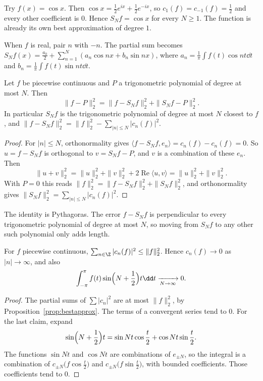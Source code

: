 Try $f(x)=\cos x$. Then $\cos x=\frac12 e^{ix}+\frac12 e^{-ix}$, so $c_1(f)=c_{-1}(f)=\frac12$ and every other coefficient is $0$. Hence $S_Nf=\cos x$ for every $N\ge1$. The function is already its own best approximation of degree $1$.

When $f$ is real, pair $n$ with $-n$. The partial sum becomes $S_Nf(x)=\frac{a_0}2+\sum_{n=1}^N(a_n\cos nx+b_n\sin nx)$, where
$a_n=\frac1\pi\int f(t)\cos nt\dd t$ and $b_n=\frac1\pi\int f(t)\sin nt\dd t$.

\begin{proposition}\label{prop:bestapprox}
Let $f$ be piecewise continuous and $P$ a trigonometric polynomial of degree at most $N$. Then
\[
\|f-P\|_2^2=\|f-S_Nf\|_2^2+\|S_Nf-P\|_2^2.
\]
In particular $S_Nf$ is the trigonometric polynomial of degree at most $N$ closest to $f$, and
$\|f-S_Nf\|_2^2=\|f\|_2^2-\sum_{|n|\le N}|c_n(f)|^2$.
\end{proposition}
\begin{proof}
For $|n|\le N$, orthonormality gives $\langle f-S_Nf,e_n\rangle=c_n(f)-c_n(f)=0$. So $u=f-S_Nf$ is orthogonal to $v=S_Nf-P$, and $v$ is a combination of these $e_n$. Then
\[
\|u+v\|_2^2=\|u\|_2^2+\|v\|_2^2+2\operatorname{Re}\langle u,v\rangle=\|u\|_2^2+\|v\|_2^2.
\]
With $P=0$ this reads $\|f\|_2^2=\|f-S_Nf\|_2^2+\|S_Nf\|_2^2$, and orthonormality gives $\|S_Nf\|_2^2=\sum_{|n|\le N}|c_n(f)|^2$.
\end{proof}

The identity is Pythagoras. The error $f-S_Nf$ is perpendicular to every trigonometric polynomial of degree at most $N$, so moving from $S_Nf$ to any other such polynomial only adds length.

\begin{corollary}\label{cor:bessel}
For $f$ piecewise continuous, $\sum_{n\in\Z}|c_n(f)|^2\le\|f\|_2^2$. Hence $c_n(f)\to0$ as $|n|\to\infty$, and also
\[
\int_{-\pi}^\pi f(t)\sin\Bigl(N+\frac12\Bigr)t\dd t\xrightarrow[N\to\infty]{}0.
\]
\end{corollary}
\begin{proof}
The partial sums of $\sum|c_n|^2$ are at most $\|f\|_2^2$, by Proposition~\ref{prop:bestapprox}. The terms of a convergent series tend to $0$. For the last claim, expand
\[
\sin\Bigl(N+\frac12\Bigr)t=\sin Nt\cos\frac t2+\cos Nt\sin\frac t2.
\]
The functions $\sin Nt$ and $\cos Nt$ are combinations of $e_{\pm N}$, so the integral is a combination of $c_{\pm N}\bigl(f\cos\frac t2\bigr)$ and $c_{\pm N}\bigl(f\sin\frac t2\bigr)$, with bounded coefficients. Those coefficients tend to $0$.
\end{proof}

